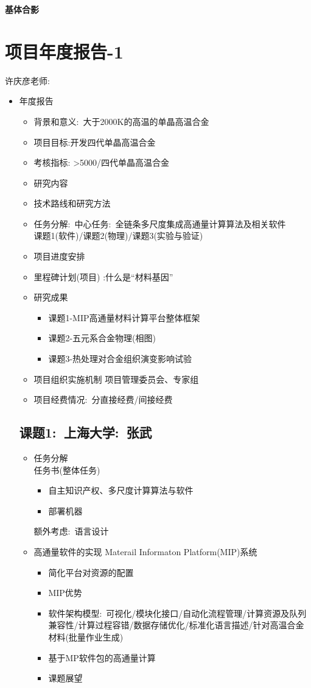 \documentclass[10pt,a4paper]{article}
\begin{document}
\textbf{基体合影}

\section{项目年度报告-1}
许庆彦老师:
\begin{itemize}
	\item 年度报告\\
		\begin{itemize}
			\item 背景和意义:~大于2000K的高温的单晶高温合金
			\item 项目目标:开发四代单晶高温合金
			\item 考核指标: >5000/四代单晶高温合金
			\item 研究内容
			\item 技术路线和研究方法
			\item 任务分解:~中心任务:~全链条多尺度集成高通量计算算法及相关软件\\
				课题1(软件)/课题2(物理)/课题3(实验与验证)
			\item 项目进度安排
			\item 里程碑计划(项目) :什么是“材料基因”
			\item 研究成果　
				\begin{itemize}
					\item 课题1-\textrm{MIP}高通量材料计算平台整体框架
					\item 课题2-五元系合金物理(相图)
					\item 课题3-热处理对合金组织演变影响试验
				\end{itemize}
			\item 项目组织实施机制 项目管理委员会、专家组
			\item 项目经费情况:~分直接经费/间接经费
		\end{itemize}

		\subsection{课题1:~上海大学:~张武}
		\begin{itemize}
			\item 任务分解\\
				任务书(整体任务)
				\begin{itemize}
					\item 自主知识产权、多尺度计算算法与软件
					\item 部署机器
				\end{itemize}
				额外考虑:~语言设计
			\item 高通量软件的实现
				\textrm{Materail Informaton Platform(MIP)}系统
				\begin{itemize}
					\item 简化平台对资源的配置
					\item \textrm{MIP}优势
					\item 软件架构模型:~可视化/模块化接口/自动化流程管理/计算资源及队列兼容性/计算过程容错/数据存储优化/标准化语言描述/针对高温合金材料(批量作业生成)
					\item 基于\textrm{MP}软件包的高通量计算
					\item 课题展望
				\end{itemize}
				

\end{itemize}
\end{itemize}
\end{document}
